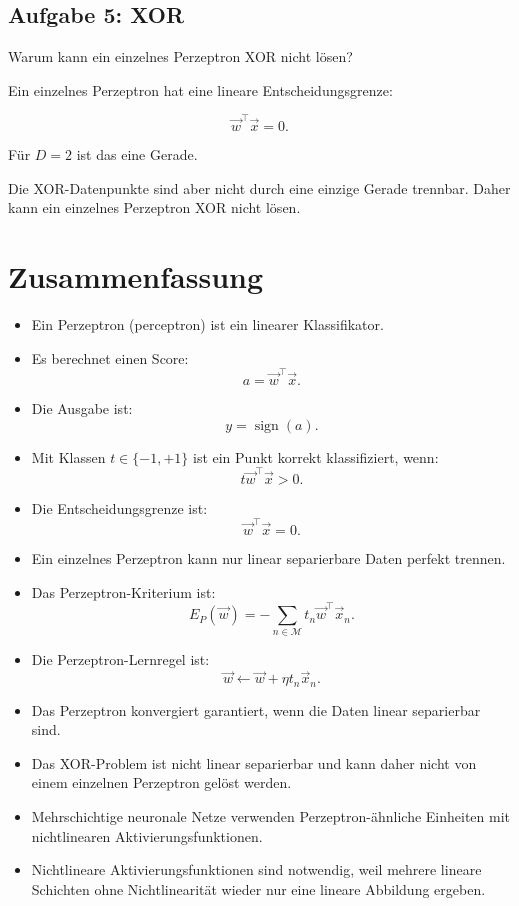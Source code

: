 \subsection{Aufgabe 5: XOR}

Warum kann ein einzelnes Perzeptron XOR nicht lösen?

\begin{examplebox}
Ein einzelnes Perzeptron hat eine lineare Entscheidungsgrenze:

\[
    \vec{w}^{\top}\vec{x}=0.
\]

Für \(D=2\) ist das eine Gerade.

Die XOR-Datenpunkte sind aber nicht durch eine einzige Gerade trennbar.
Daher kann ein einzelnes Perzeptron XOR nicht lösen.
\end{examplebox}

\section{Zusammenfassung}

\begin{itemize}
    \item Ein Perzeptron (perceptron) ist ein linearer Klassifikator.
    \item Es berechnet einen Score:
    \[
        a
        =
        \vec{w}^{\top}\vec{x}.
    \]
    \item Die Ausgabe ist:
    \[
        y
        =
        \operatorname{sign}(a).
    \]
    \item Mit Klassen \(t\in\{-1,+1\}\) ist ein Punkt korrekt klassifiziert, wenn:
    \[
        t\vec{w}^{\top}\vec{x}>0.
    \]
    \item Die Entscheidungsgrenze ist:
    \[
        \vec{w}^{\top}\vec{x}=0.
    \]
    \item Ein einzelnes Perzeptron kann nur linear separierbare Daten perfekt trennen.
    \item Das Perzeptron-Kriterium ist:
    \[
        E_P(\vec{w})
        =
        -\sum_{n\in\mathcal{M}}
        t_n\vec{w}^{\top}\vec{x}_n.
    \]
    \item Die Perzeptron-Lernregel ist:
    \[
        \vec{w}
        \leftarrow
        \vec{w}
        +
        \eta t_n\vec{x}_n.
    \]
    \item Das Perzeptron konvergiert garantiert, wenn die Daten linear separierbar sind.
    \item Das XOR-Problem ist nicht linear separierbar und kann daher nicht von einem einzelnen Perzeptron gelöst werden.
    \item Mehrschichtige neuronale Netze verwenden Perzeptron-ähnliche Einheiten mit nichtlinearen Aktivierungsfunktionen.
    \item Nichtlineare Aktivierungsfunktionen sind notwendig, weil mehrere lineare Schichten ohne Nichtlinearität wieder nur eine lineare Abbildung ergeben.
\end{itemize}

